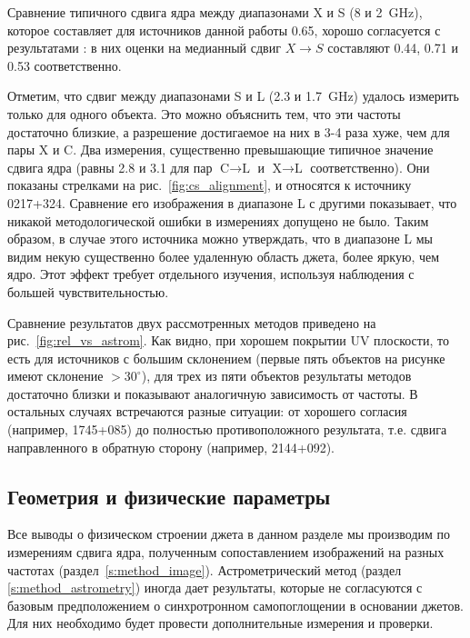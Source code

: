 Сравнение типичного сдвига ядра между диапазонами X и S (8 и \SI{2}{\GHz}), которое составляет для
источников данной работы \SI{0.65}{\mas}, хорошо согласуется с результатами
\cite{Kovalev_2008,Sokolovsky_2011,Plavin2018}: в них оценки на медианный
сдвиг $X\to S$ составляют 0.44, 0.71 и \SI{0.53}{\mas} соответственно.

Отметим, что сдвиг между диапазонами S и L (2.3 и \SI{1.7}{\GHz}) удалось измерить только для одного
объекта. Это можно объяснить тем, что эти частоты достаточно близкие, а разрешение достигаемое на
них в 3-4 раза хуже, чем для пары X и C. Два измерения, существенно превышающие типичное значение
сдвига ядра (равны 2.8 и \SI{3.1}{\mas} для пар $\text{C} \to \text{L}$ и $\text{X} \to \text{L}$
соответственно). Они показаны стрелками на рис.~\ref{fig:cs_alignment}, и относятся к источнику
0217+324. Сравнение его изображения в диапазоне L с другими показывает, что никакой методологической
ошибки в измерениях допущено не было. Таким образом, в случае этого источника можно утверждать, что
в диапазоне L мы видим некую существенно более удаленную область джета, более яркую, чем ядро. Этот
эффект требует отдельного изучения, используя наблюдения с большей чувствительностью.

Сравнение результатов двух рассмотренных методов приведено на рис.~\ref{fig:rel_vs_astrom}. Как
видно, при хорошем покрытии UV плоскости, то есть для источников с большим склонением (первые пять
объектов на рисунке имеют склонение $> 30^\circ$), для трех из пяти объектов результаты методов
достаточно близки и показывают аналогичную зависимость от частоты. В остальных случаях встречаются
разные ситуации: от хорошего согласия (например, 1745+085) до полностью противоположного
результата, т.е. сдвига направленного в обратную сторону (например, 2144+092).

\subsection{Геометрия и физические параметры}
\label{s:res_phys}

Все выводы о физическом строении джета в данном разделе мы производим по измерениям сдвига ядра,
полученным сопоставлением изображений на разных частотах (раздел~\ref{s:method_image}).
Астрометрический метод (раздел \ref{s:method_astrometry}) иногда дает результаты, которые не
согласуются с базовым предположением о синхротронном самопоглощении в основании джетов.
Для них необходимо будет провести дополнительные измерения и проверки.

